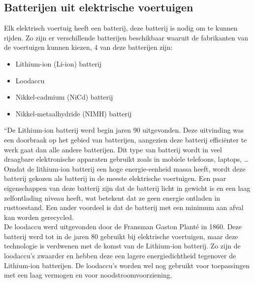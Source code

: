 \subsection{Batterijen uit elektrische voertuigen}
\label{sec:stand-van-zaken-bidirectioneel-laden-batterijen}

Elk elektrisch voertuig heeft een batterij, deze batterij is nodig om te kunnen rijden. Zo zijn er verschillende batterijen beschikbaar waaruit de fabrikanten van de voertuigen kunnen kiezen, 4 van deze batterijen zijn:

\begin{itemize}
    \item Lithium-ion (Li-ion) batterij
    \item Loodaccu
    \item Nikkel-cadmium (NiCd) batterij
    \item Nikkel-metaalhydride (NIMH) batterij
\end{itemize}

“De Lithium-ion batterij werd begin jaren 90 uitgevonden. Deze uitvinding was een doorbraak op het gebied van batterijen, aangezien deze batterij efficiënter te werk gaat dan alle andere batterijen. Dit type van batterij wordt in veel draagbare elektronische apparaten gebruikt zoals in mobiele telefoons, laptops, …\\

Omdat de lithium-ion batterij een hoge energie-eenheid massa heeft, wordt deze batterij gekozen als batterij in de meeste elektrische voertuigen. Een paar eigenschappen van deze batterij zijn dat de batterij licht in gewicht is en een laag zelfontlading niveau heeft, wat betekent dat ze geen energie ontladen in rusttoestand. Een ander voordeel is dat de batterij met een minimum aan afval kan worden gerecycled.\\

De loodaccu werd uitgevonden door de Fransman Gaston Planté in 1860. Deze batterij werd tot in de jaren 80 gebruikt bij elektrische voertuigen, maar deze technologie is verdwenen met de komst van de Lithium-ion batterij. Zo zijn de loodaccu’s zwaarder en hebben deze een lagere energiedichtheid tegenover de Lithium-ion batterijen. De loodaccu’s worden wel nog gebruikt voor toepassingen met een laag vermogen en voor noodstroomvoorziening.\\

